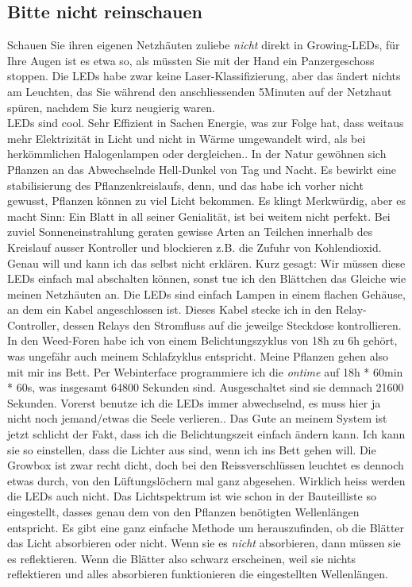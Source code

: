 \documentclass[12pt,titlepage,a4paper]{article}
\begin{document}
\subsection{Bitte nicht reinschauen}
Schauen Sie ihren eigenen Netzhäuten zuliebe \textit{nicht} direkt in Growing-LEDs, für Ihre Augen ist es etwa so, als müssten Sie mit der Hand ein Panzergeschoss stoppen. Die LEDs habe zwar keine Laser-Klassifizierung, aber das ändert nichts am Leuchten, das Sie während den anschliessenden 5Minuten auf der Netzhaut spüren, nachdem Sie kurz neugierig waren.\\LEDs sind cool. Sehr Effizient in Sachen Energie, was zur Folge hat, dass weitaus mehr Elektrizität in Licht und nicht in Wärme umgewandelt wird, als bei herkömmlichen Halogenlampen oder dergleichen.. In der Natur gewöhnen sich Pflanzen an das Abwechselnde Hell-Dunkel von Tag und Nacht. Es bewirkt eine stabilisierung des Pflanzenkreislaufs, denn, und das habe ich vorher nicht gewusst, Pflanzen können zu viel Licht bekommen. Es klingt Merkwürdig, aber es macht Sinn: Ein Blatt in all seiner Genialität, ist bei weitem nicht perfekt. Bei zuviel Sonneneinstrahlung geraten gewisse Arten an Teilchen innerhalb des Kreislauf ausser Kontroller und blockieren z.B. die Zufuhr von Kohlendioxid. Genau will und kann ich das selbst nicht erklären. Kurz gesagt: Wir müssen diese LEDs einfach mal abschalten können, sonst tue ich den Blättchen das Gleiche wie meinen Netzhäuten an. Die LEDs sind einfach Lampen in einem flachen Gehäuse, an dem ein Kabel angeschlossen ist. Dieses Kabel stecke ich in den Relay-Controller, dessen Relays den Stromfluss auf die jeweilge Steckdose kontrollieren. In den Weed-Foren habe ich von einem Belichtungszyklus von 18h zu 6h gehört, was ungefähr auch meinem Schlafzyklus entspricht. Meine Pflanzen gehen also mit mir ins Bett. Per Webinterface programmiere ich die \textit{ontime} auf 18h * 60min * 60s, was insgesamt 64800 Sekunden sind. Ausgeschaltet sind sie demnach 21600 Sekunden. Vorerst benutze ich die LEDs immer abwechselnd, es muss hier ja nicht noch jemand/etwas die Seele verlieren.. Das Gute an meinem System ist jetzt schlicht der Fakt, dass ich die Belichtungszeit einfach ändern kann. Ich kann sie so einstellen, dass die Lichter aus sind, wenn ich ins Bett gehen will. Die Growbox ist zwar recht dicht, doch bei den Reissverschlüssen leuchtet es dennoch etwas durch, von den Lüftungslöchern mal ganz abgesehen. Wirklich heiss werden die LEDs auch nicht. Das Lichtspektrum ist wie schon in der Bauteilliste so eingestellt, dasses genau dem von den Pflanzen benötigten Wellenlängen entspricht. Es gibt eine ganz einfache Methode um herauszufinden, ob die Blätter das Licht absorbieren oder nicht. Wenn sie es \textit{nicht} absorbieren, dann müssen sie es reflektieren. Wenn die Blätter also schwarz erscheinen, weil sie nichts reflektieren und alles absorbieren funktionieren die eingestellten Wellenlängen.
\end{document}
